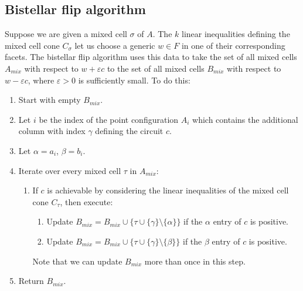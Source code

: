 \documentclass[a4paper,12pt]{article}
\begin{document}
\subsection{Bistellar flip algorithm}
Suppose we are given a mixed cell $\sigma$ of $A$. The $k$ linear inequalities defining the mixed cell cone $C_\sigma$ let us choose a generic $w \in F$ in one of their corresponding facets. The bistellar flip algorithm uses this data to take the set of all mixed cells $A_{mix}$ with respect to $w + \varepsilon c$ to the set of all mixed cells $B_{mix}$ with respect to $w - \varepsilon c$, where $\varepsilon > 0$ is sufficiently small. To do this:
\begin{enumerate}
	\item Start with empty $B_{mix}$.
	\item Let $i$ be the index of the point configuration $A_i$ which contains the additional column with index $\gamma$ defining the circuit $c$.
	\item Let $\alpha = a_i$, $\beta = b_i$.
	\item Iterate over every mixed cell $\tau$ in $A_{mix}$:
	\begin{enumerate} 
	\item If $c$ is achievable by considering the linear inequalities of the mixed cell cone $C_\tau$, then execute: \begin{enumerate}
	\item Update $B_{mix} = B_{mix} \cup \{ \tau \cup \{\gamma\} \setminus \{\alpha\} \}$ if the $\alpha$ entry of $c$ is positive.
	\item Update $B_{mix} = B_{mix} \cup \{ \tau \cup \{\gamma\} \setminus \{\beta\} \}$ if the $\beta$ entry of $c$ is positive.
	\end{enumerate}
	Note that we can update $B_{mix}$ more than once in this step.
	 \end{enumerate}
	 \item Return $B_{mix}$.
\end{enumerate}
\end{document}
